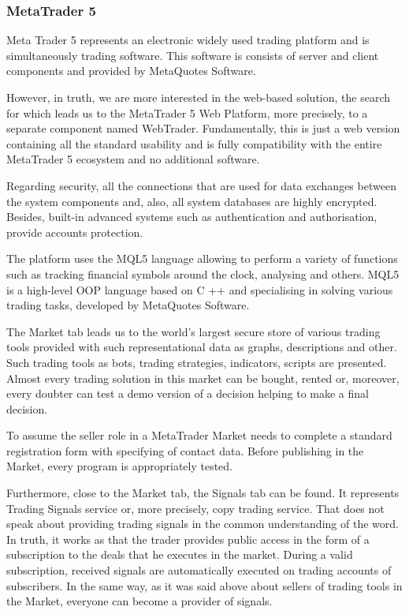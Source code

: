 \documentclass[thesis=B,english]{FITthesis}[2019/03/06]
\begin{document}
\subsubsection{MetaTrader 5 \cite{noauthor_metatrader_nodate}}
Meta Trader 5 represents an electronic widely used trading platform and is simultaneously trading software. This software is consists of server and client components and provided by MetaQuotes Software. 

However, in truth, we are more interested in the web-based solution,  the search for which leads us to the MetaTrader 5 Web Platform, more precisely, to a separate component named WebTrader.
Fundamentally, this is just a web version containing all the standard usability and is fully compatibility with the entire MetaTrader 5 ecosystem and no additional software.

Regarding security, all the connections that are used for data exchanges between the system components and, also, all system databases are highly encrypted. Besides, built-in advanced systems such as authentication and authorisation, provide accounts protection.

The platform uses the MQL5 language allowing to perform a variety of functions such as tracking financial symbols around the clock, analysing and others. MQL5 is a high-level OOP language based on C ++ and specialising in solving various trading tasks, developed by MetaQuotes Software.

The Market tab leads us to the world's largest secure store of various trading tools provided with such representational data as graphs, descriptions and other. Such trading tools as bots, trading strategies, indicators, scripts are presented. Almost every trading solution in this market can be bought, rented or, moreover, every doubter can test a demo version of a decision helping to make a final decision.

To assume the seller role in a MetaTrader Market needs to complete a standard registration form with specifying of contact data. Before publishing in the Market, every program is appropriately tested.

Furthermore, close to the Market tab, the Signals tab can be found. It represents Trading Signals service or, more precisely, copy trading service.  That does not speak about providing trading signals in the common understanding of the word. In truth, it works as that the trader provides public access in the form of a subscription to the deals that he executes in the market.  During a valid subscription, received signals are automatically executed on trading accounts of subscribers. In the same way, as it was said above about sellers of trading tools in the Market, everyone can become a provider of signals.
\end{document}
